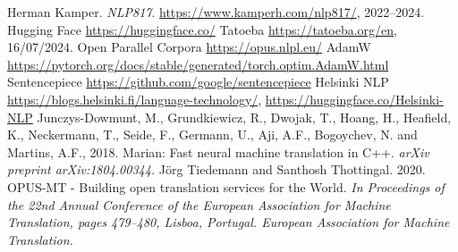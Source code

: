 \begin{thebibliography}{1}

 Herman Kamper. \emph{NLP817}. \href{https://www.kamperh.com/nlp817/}{https://www.kamperh.com/nlp817/}, 2022--2024.
 Hugging Face \href{https://huggingface.co/}{https://huggingface.co/}
 Tatoeba \href{https://tatoeba.org/en}{https://tatoeba.org/en}, 16/07/2024.
 Open Parallel Corpora \href{https://opus.nlpl.eu/}{https://opus.nlpl.eu/}
 AdamW \href{https://pytorch.org/docs/stable/generated/torch.optim.AdamW.html}{https://pytorch.org/docs/stable/generated/torch.optim.AdamW.html}
 Sentencepiece \href{https://github.com/google/sentencepiece}{https://github.com/google/sentencepiece}
 Helsinki NLP \href{https://blogs.helsinki.fi/language-technology/}{https://blogs.helsinki.fi/language-technology/}, \href{https://huggingface.co/Helsinki-NLP}{https://huggingface.co/Helsinki-NLP}
 Junczys-Dowmunt, M., Grundkiewicz, R., Dwojak, T., Hoang, H., Heafield, K., Neckermann, T., Seide, F., Germann, U., Aji, A.F., Bogoychev, N. and Martins, A.F., 2018. Marian: Fast neural machine translation in C++. \textit{arXiv preprint arXiv:1804.00344.}
 Jörg Tiedemann and Santhosh Thottingal. 2020. OPUS-MT - Building open translation services for the World. \textit{In Proceedings of the 22nd Annual Conference of the European Association for Machine Translation, pages 479–480, Lisboa, Portugal. European Association for Machine Translation.}
\end{thebibliography}